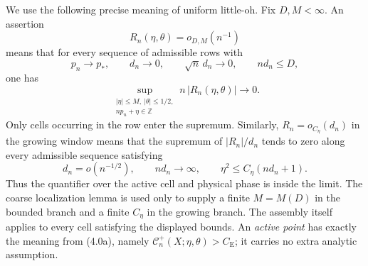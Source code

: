 \documentclass[11pt,a4paper]{article}
\numberwithin{equation}{section}
\theoremstyle{definition}
\theoremstyle{remark}
\newcommand{\CE}{C_{\mathrm E}}
\begin{document}
We use the following precise meaning of uniform little-oh.  Fix
\(D,M<\infty\).  An assertion
\[
 R_n(\eta,\theta)=o_{D,M}(n^{-1})                         \tag{S.2}
\]
means that for every sequence of admissible rows with
\[
 p_n\to p_*,\qquad d_n\to0,\qquad \sqrt n\,d_n\to0,
 \qquad nd_n\le D,
\]
one has
\[
 \sup_{\substack{|\eta|\le M,\ |\theta|\le1/2,\\
                  np_n+\eta\in\mathbb Z}}
       n\,|R_n(\eta,\theta)|\longrightarrow0.            \tag{S.3}
\]
Only cells occurring in the row enter the supremum.  Similarly,
\(R_n=o_{C_\eta}(d_n)\) in the growing window means that the supremum of
\(|R_n|/d_n\) tends to zero along every admissible sequence satisfying
\[
 d_n=o(n^{-1/2}),\qquad nd_n\to\infty,\qquad
 \eta^2\le C_\eta(nd_n+1).                              \tag{S.4}
\]
Thus the quantifier over the active cell and physical phase is inside the
limit.  The coarse localization lemma is used only to supply a
finite \(M=M(D)\) in the bounded branch and a finite \(C_\eta\) in the
growing branch.  The assembly itself applies to every cell satisfying the
displayed bounds.  An \emph{active point} has exactly the meaning from
(4.0a), namely \(\mathcal C_n^+(X;\eta,\theta)>\CE\); it carries no extra
analytic assumption.
\end{document}
